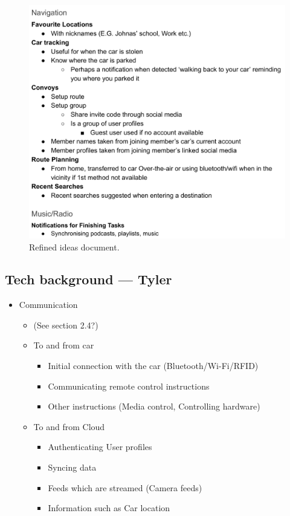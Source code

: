 \documentclass{article}
\begin{document}
\begin{figure}[H]
  \centering
  \includegraphics[scale=0.25]{refined-ideas}
  \caption{Refined ideas document.}\label{refined-ideas}
\end{figure}

\subsection{Tech background --- Tyler}\label{ssec:app-tech}
\begin{itemize}
  \item Communication
    \begin{itemize}
      \item (See section 2.4?)
      \item To and from car
        \begin{itemize}
          \item Initial connection with the car (Bluetooth/Wi-Fi/RFID)
          \item Communicating remote control instructions
          \item Other instructions (Media control, Controlling hardware)
        \end{itemize}
      \item To and from Cloud
        \begin{itemize}
          \item Authenticating User profiles
          \item Syncing data
          \item Feeds which are streamed (Camera feeds)
          \item Information such as Car location
        \end{itemize}
    \end{itemize}
\end{itemize}
\end{document}
